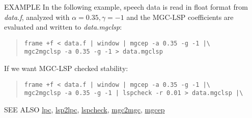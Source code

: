 \begin{qsection}{EXAMPLE}
In the following example, speech data is read in float format from
{\em data.f}, analyzed with $\alpha = 0.35, \gamma = -1$
and the MGC-LSP coefficients are evaluated and written to {\em data.mgclsp}:
\begin{quote}
\verb!frame +f < data.f | window | mgcep -a 0.35 -g -1 |\!\\
\verb!mgc2mgclsp -a 0.35 -g -1 > data.mgclsp!
\end{quote}
If we want MGC-LSP checked stability:
\begin{quote}
\verb!frame +f < data.f | window | mgcep -a 0.35 -g -1 |\!\\
\verb!mgc2mgclsp -a 0.35 -g -1 | lspcheck -r 0.01 > data.mgclsp |\! \\
\end{quote}
\end{qsection}

\begin{qsection}{SEE ALSO}
\hyperlink{lpc}{lpc},
\hyperlink{lsp2lpc}{lsp2lpc},
\hyperlink{lspcheck}{lspcheck},
\hyperlink{mgc2mgc}{mgc2mgc},
\hyperlink{mgcep}{mgcep}
\end{qsection}

